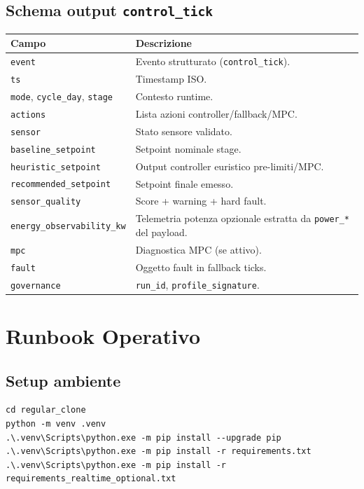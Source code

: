 ﻿\documentclass[11pt,a4paper]{report}
\begin{document}
\section{Schema output \texttt{control\_tick}}
\begin{longtable}{@{}p{3.8cm}p{9.4cm}@{}}
\toprule
Campo & Descrizione \\ \midrule
\texttt{event} & Evento strutturato (\texttt{control\_tick}). \\
\texttt{ts} & Timestamp ISO. \\
\texttt{mode}, \texttt{cycle\_day}, \texttt{stage} & Contesto runtime. \\
\texttt{actions} & Lista azioni controller/fallback/MPC. \\
\texttt{sensor} & Stato sensore validato. \\
\texttt{baseline\_setpoint} & Setpoint nominale stage. \\
\texttt{heuristic\_setpoint} & Output controller euristico pre-limiti/MPC. \\
\texttt{recommended\_setpoint} & Setpoint finale emesso. \\
\texttt{sensor\_quality} & Score + warning + hard fault. \\
\texttt{energy\_observability\_kw} & Telemetria potenza opzionale estratta da \texttt{power\_*} del payload. \\
\texttt{mpc} & Diagnostica MPC (se attivo). \\
\texttt{fault} & Oggetto fault in fallback ticks. \\
\texttt{governance} & \texttt{run\_id}, \texttt{profile\_signature}. \\
\bottomrule
\end{longtable}

\newpage
\chapter{Runbook Operativo}

\section{Setup ambiente}
\begin{lstlisting}
cd regular_clone
python -m venv .venv
.\.venv\Scripts\python.exe -m pip install --upgrade pip
.\.venv\Scripts\python.exe -m pip install -r requirements.txt
.\.venv\Scripts\python.exe -m pip install -r requirements_realtime_optional.txt
\end{lstlisting}
\end{document}
